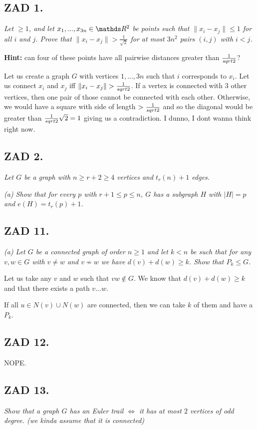 \documentclass{article}[13pt]
\begin{document}
\subsection*{ZAD 1.}
\emph{Let $\geq1$, and let $x_1,...,x_{3n}\in\R^2$ be points such that $\|x_i-x_j\|\leq1$ for all $i$ and $j$. Prove that $\|x_i-x_j\|>\frac1{\sqrt{2}}$ for at most $3n^2$ pairs $(i,j)$ with $i<j$.}

\textbf{Hint:} can four of these points have all pairwise distances greater than ${1\over sqrt{2}}$?
\medskip

Let us create a graph $G$ with vertices $1,...,3n$ such that $i$ corresponds to $x_i$. Let us connect $x_i$ and $x_j$ iff $\|x_i-x_j\|>{1\over sqrt2}$. If a vertex is connected with $3$ other vertices, then one pair of those cannot be connected with each other. Otherwise, we would have a square with side of length $>{1\over sqrt2}$ and so the diagonal would be greater than ${1\over sqrt2}\sqrt2=1$ giving us a contradiction. I dunno, I dont wanna think right now.

\subsection*{ZAD 2.}
\emph{Let $G$ be a graph with $n\geq r+2\geq 4$ vertices and $t_r(n)+1$ edges.}

\emph{(a) Show that for every $p$ with $r+1\leq p\leq n$, $G$ has a subgraph $H$ with $|H|=p$ and $e(H)=t_r(p)+1$.}
\medskip

\subsection*{ZAD 11.}
\emph{(a) Let $G$ be a connected graph of order $n\geq1$ and let $k<n$ be such that for any $v,w\in G$ with $v\neq w$ and $v\not \sim w$ we have $d(v)+d(w)\geq k$. Show that $P_k\leq G$.}
\medskip

Let us take any $v$ and $w$ such that $vw\notin G$. We know that $d(v)+d(w)\geq k$ and that there exists a path $v...w$.

If all $u\in N(v)\cup N(w)$ are connected, then we can take $k$ of them and have a $P_k$.

\subsection*{ZAD 12.}

NOPE.

\subsection*{ZAD 13.}
\emph{Show that a graph $G$ has an Euler trail $\iff$ it has at most $2$ vertices of odd degree. (we kinda assume that it is connected)}
\end{document}
